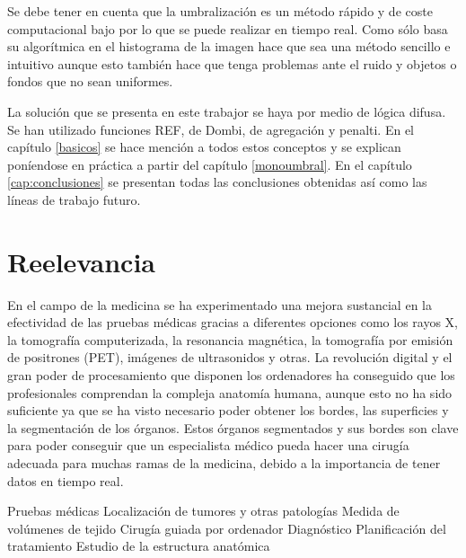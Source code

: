  Se debe tener en cuenta que la umbralización es un método rápido y de coste computacional bajo por lo que se puede realizar en tiempo real. Como sólo basa su algorítmica en el histograma de la imagen hace que sea una método sencillo e intuitivo aunque esto también hace que tenga problemas ante el ruido y objetos o fondos que no sean uniformes.

La solución que se presenta en este trabajor se haya por medio de lógica difusa. Se han utilizado funciones REF, de Dombi, de agregación y penalti. En el capítulo \ref{basicos} se hace mención a todos estos conceptos y se explican poníendose en práctica a partir del capítulo \ref{monoumbral}. En el capítulo \ref{cap:conclusiones} se presentan todas las conclusiones obtenidas así como las líneas de trabajo futuro.


\section{Reelevancia}\label{sec:reelevancia}

En el campo de la medicina \cite{lib:suri} se ha experimentado una mejora sustancial en la efectividad de las pruebas médicas gracias a diferentes opciones como los rayos X, la tomografía computerizada, la resonancia magnética, la tomografía por emisión de positrones (PET), imágenes de ultrasonidos y otras. La revolución digital y el gran poder de procesamiento que disponen los ordenadores ha conseguido que los profesionales comprendan la compleja anatomía humana, aunque esto no ha sido suficiente ya que se ha visto necesario poder obtener los bordes, las superficies y la segmentación de los órganos. Estos órganos segmentados y sus bordes son clave para poder conseguir que un especialista médico pueda hacer una cirugía adecuada para muchas ramas de la medicina, debido a la importancia de tener datos en tiempo real. 


Pruebas médicas
Localización de tumores y otras patologías
Medida de volúmenes de tejido
Cirugía guiada por ordenador
Diagnóstico
Planificación del tratamiento
Estudio de la estructura anatómica

